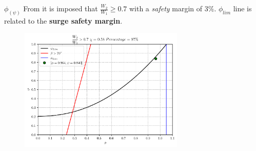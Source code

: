 	\begin{frame}{$\phi_{(\psi)}$}
		From \cite[Sec. 10.4]{axial2004} it is imposed that $\frac{W_2}{W_1} \geq 0.7$ with a \textit{safety} margin of $3 \%$. $\phi_{lim}$ line is related to the \textbf{surge safety margin}.  
		\begin{figure}
			\centering
			\includegraphics[width=0.7\textwidth]{figures/stagePerf.pdf}
		\end{figure}
	\end{frame}

